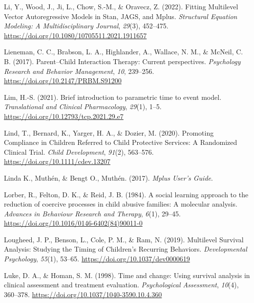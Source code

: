 \documentclass[12pt]{./styles/outhesis}
\begin{document}
\leavevmode{}%
Li, Y., Wood, J., Ji, L., Chow, S.-M., \& Oravecz, Z. (2022). Fitting
{Multilevel Vector Autoregressive Models} in {Stan}, {JAGS}, and
{Mplus}. \emph{Structural Equation Modeling: A Multidisciplinary
Journal}, \emph{29}(3), 452--475.
\url{https://doi.org/10.1080/10705511.2021.1911657}

\leavevmode{}%
Lieneman, C. C., Brabson, L. A., Highlander, A., Wallace, N. M., \&
McNeil, C. B. (2017). Parent--{Child Interaction Therapy}: Current
perspectives. \emph{Psychology Research and Behavior Management},
\emph{10}, 239--256. \url{https://doi.org/10.2147/PRBM.S91200}

\leavevmode{}%
Lim, H.-S. (2021). Brief introduction to parametric time to event model.
\emph{Translational and Clinical Pharmacology}, \emph{29}(1), 1--5.
\url{https://doi.org/10.12793/tcp.2021.29.e7}

\leavevmode{}%
Lind, T., Bernard, K., Yarger, H. A., \& Dozier, M. (2020). Promoting
{Compliance} in {Children Referred} to {Child Protective Services}: {A
Randomized Clinical Trial}. \emph{Child Development}, \emph{91}(2),
563--576. \url{https://doi.org/10.1111/cdev.13207}

\leavevmode{}%
Linda K., Muthén, \& Bengt O., Muthén. (2017). \emph{Mplus {User}'s
{Guide}}.

\leavevmode{}%
Lorber, R., Felton, D. K., \& Reid, J. B. (1984). A social learning
approach to the reduction of coercive processes in child abusive
families: {A} molecular analysis. \emph{Advances in Behaviour Research
and Therapy}, \emph{6}(1), 29--45.
\url{https://doi.org/10.1016/0146-6402(84)90011-0}

\leavevmode{}%
Lougheed, J. P., Benson, L., Cole, P. M., \& Ram, N. (2019). Multilevel
{Survival Analysis}: {Studying} the {Timing} of {Children}'s {Recurring
Behaviors}. \emph{Developmental Psychology}, \emph{55}(1), 53--65.
\url{https://doi.org/10.1037/dev0000619}

\leavevmode{}%
Luke, D. A., \& Homan, S. M. (1998). Time and change: {Using} survival
analysis in clinical assessment and treatment evaluation.
\emph{Psychological Assessment}, \emph{10}(4), 360--378.
\url{https://doi.org/10.1037/1040-3590.10.4.360}
\end{document}
